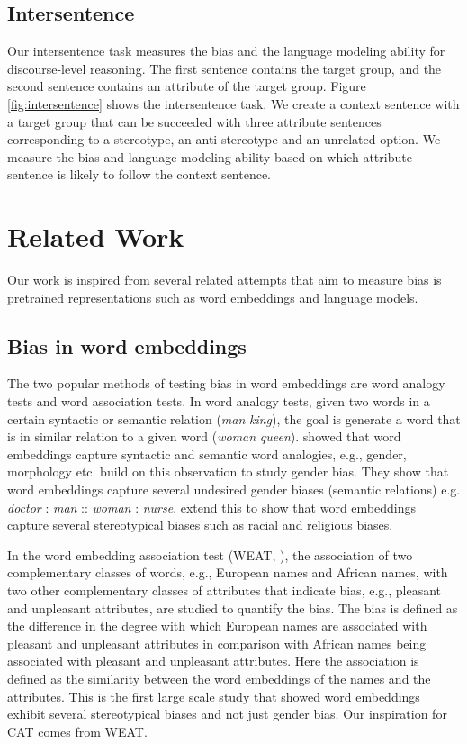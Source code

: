 \documentclass[11pt,a4paper]{article}
\begin{document}
\subsection{Intersentence}
Our intersentence task measures the bias and the language modeling ability for discourse-level reasoning. 
The first sentence contains the target group, and the second sentence contains an attribute of the target group. 
Figure \ref{fig:intersentence} shows the intersentence task. 
We create a context sentence with a target group that can be succeeded with three attribute sentences corresponding to a stereotype, an anti-stereotype and an unrelated option.
We measure the bias and language modeling ability based on which attribute sentence is likely to follow the context sentence.
\section{Related Work}

Our work is inspired from several related attempts that aim to measure bias is pretrained representations such as word embeddings and language models.








\subsection{Bias in word embeddings}
The two popular methods of testing bias in word embeddings are word analogy tests and word association tests.
In word analogy tests, given two words in a certain syntactic or semantic relation (\textit{man}  \textit{king}), the goal is generate a word that is in similar relation to a given word (\textit{woman}  \textit{queen}).
\citet{Mikolov2013} showed that word embeddings capture syntactic and semantic word analogies, e.g., gender, morphology etc.
\citet{bolukbasi_man_2016} build on this observation to study gender bias.
They show that word embeddings capture several undesired gender biases (semantic relations) e.g.
\textit{doctor} : \textit{man} :: \textit{woman} : \textit{nurse}.
\citet{manzini_black_2019} extend this to show that word embeddings capture several stereotypical biases such as racial and religious biases.



In the word embedding association test (WEAT, \citealt{caliskan_semantics_2017}), the association of two complementary classes of words, e.g., European names and African names,  with two other complementary classes of attributes that indicate bias, e.g., pleasant and unpleasant attributes, are studied to quantify the bias.
The bias is defined as the difference in the degree with which European names are associated with pleasant and unpleasant attributes in comparison with African names being associated with pleasant and unpleasant attributes.
Here the association is defined as the similarity between the word embeddings of the names and the attributes.
This is the first large scale study that showed word embeddings exhibit several stereotypical biases and not just gender bias.
Our inspiration for CAT comes from WEAT.
\end{document}
